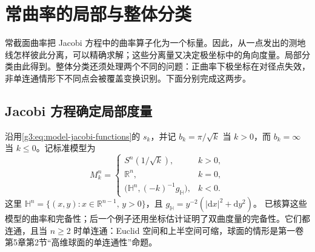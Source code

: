 
% 
% 

\section{常曲率的局部与整体分类}
\label{g3:sec:0902}

常截面曲率把 Jacobi 方程中的曲率算子化为一个标量。因此，从一点发出的测地线怎样彼此分离，可以精确求解；这些分离量又决定极坐标中的角向度量。局部分类由此得到。整体分类还须处理两个不同的问题：正曲率下极坐标在对径点失效，非单连通情形下不同点会被覆盖变换识别。下面分别完成这两步。

\subsection{Jacobi 方程确定局部度量}
\label{g3:subsec:0902:01}

沿用\eqref{g3:eq:model-jacobi-functions}的 \(s_k\)，并记 \(b_k=\pi/\sqrt{k}\) 当 \(k>0\)，而 \(b_k=\infty\) 当 \(k\le0\)。记标准模型为
\begin{equation}\label{g3:eq:standard-space-form-models}
	M_k^n=
	\begin{cases}
		S^n(1/\sqrt{k}),&k>0,\\
		\mathbb R^n,&k=0,\\
		\bigl(\mathbb H^n,(-k)^{-1}g_{\mathbb H}\bigr),&k<0.
	\end{cases}
\end{equation}
这里 \(\mathbb H^n=\{(x,y):x\in\mathbb R^{n-1},\,y>0\}\)，且
\(g_{\mathbb H}=y^{-2}(|\mathrm dx|^2+\mathrm dy^2)\)。
已核算这些模型的曲率和完备性；后一个例子还用坐标估计证明了双曲度量的完备性。它们都连通，且当 \(n\ge2\) 时单连通：Euclid 空间和上半空间可缩，球面的情形是第一卷第5章第2节“高维球面的单连通性”命题。


